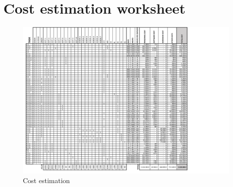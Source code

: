 

\section{Cost estimation worksheet}

	\begin{figure}[H]
	\centering
		\includegraphics[page=1,width=1.3\textwidth]{./Task8/Coststask8_v2.pdf}
	\caption{Cost estimation}
	\label{costestimation}
	\end{figure}


